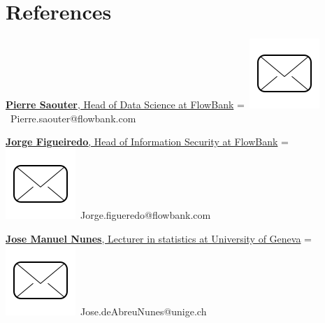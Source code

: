 \documentclass[]{plushcv}
\begin{document}
\begin{minipage}[t]{0.70\textwidth}
\sectionsep

\sectionsep







\section{References} 
\href{https://genev.unige.ch/research/people/Jose-Manuel-De-Abreu-Nunes}{\textbf{Pierre Saouter},  Head of Data Science at FlowBank}
\begingroup
{}=\hbox{
\includegraphics[scale=0.1,trim={0 1cm 0cm 0cm}]{icons/main/mail.png}\hspace{0.1cm} Pierre.saouter@flowbank.com
}
\parbox{\wd0}{}\endgroup
\sectionsep


\href{https://genev.unige.ch/research/people/Jose-Manuel-De-Abreu-Nunes}{\textbf{Jorge Figueiredo},  Head of Information Security at FlowBank}
\begingroup
{}=\hbox{
\includegraphics[scale=0.1,trim={0 1cm 0cm 0cm}]{icons/main/mail.png}\hspace{0.1cm} Jorge.figueredo@flowbank.com
}
\parbox{\wd0}{}\endgroup
\sectionsep

\href{https://genev.unige.ch/research/people/Jose-Manuel-De-Abreu-Nunes}{\textbf{Jose Manuel Nunes}, Lecturer in statistics at University of Geneva}
\begingroup
{}=\hbox{
\includegraphics[scale=0.1,trim={0 1cm 0cm 0cm}]{icons/main/mail.png}\hspace{0.1cm} Jose.deAbreuNunes@unige.ch
}
\parbox{\wd0}{}\endgroup
\sectionsep


\end{minipage}
\end{document}
